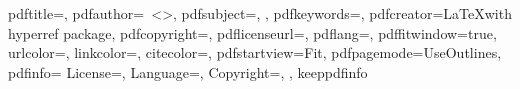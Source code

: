 \newcommand{\contactauthor}{\myAuthorFullName~\textless\href{mailto:\myAuthorEmail}{\myAuthorEmail}\textgreater}

{
  \newcommand{\keywordsforpdf}{\myThesisKeywordsEnglish}
}
{
  \newcommand{\keywordsforpdf}{\myThesisKeywords}
}

\newcommand{\underscoreSpacingFour}{\_\_\_\_}
\newcommand{\spacingFour}{~~~~}


\hypersetup
{
  pdftitle={\myBookTitle},
  pdfauthor={\myAuthorFullName~\textless\href{mailto:\myAuthorEmail}{\myAuthorEmail}\textgreater},
  pdfsubject={\myDegreefull, \myWorkTypeFull},
  pdfkeywords={\keywordsforpdf},
  pdfcreator={\LaTeX with hyperref package},
  pdfcopyright={\myCopyrightStatement},
  pdflicenseurl={\myLicenseURL},
  pdflang={\mypdflang},
  pdffitwindow={true},
  urlcolor=\myurlcolor,
  linkcolor=\mylinkcolor,
  citecolor=\mycitecolor,
  pdfstartview=Fit,
  pdfpagemode=UseOutlines,
  pdfinfo={
    License={\myLicenseURL},
    Language={\mypdflang},
    Copyright={\myCopyrightStatement},
  },
  keeppdfinfo %
}


\usepackage{tocloft}

{
\newcommand{\videoLink}[2]{%
  \refstepcounter{videos}%
  \phantomsection%
  \addcontentsline{vdo}{videos}{\protect\numberline{\thechapter.\thevideos\hspace{4em}}\hspace{4em}#1 (\href{#2}{link to video})}\href{#2}{#1}}
}
{
\newcommand{\videoLink}[2]{%
  \refstepcounter{videos}%
  \phantomsection%
  \addcontentsline{vdo}{videos}{\protect\numberline{\thechapter.\thevideos\hspace{4em}}\hspace{4em}#1 (\href{#2}{enlace al vídeo})}\href{#2}{#1}}
}




